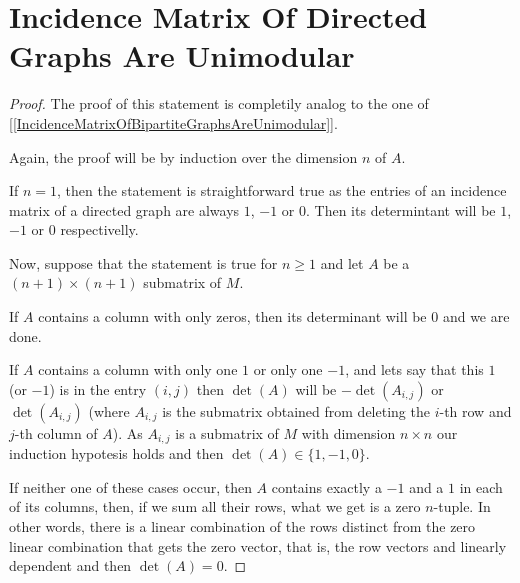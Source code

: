 ﻿\chapter{Incidence Matrix Of Directed Graphs Are Unimodular}


\begin{proof}
    The proof of this statement is completily analog to the one of [\ref{IncidenceMatrixOfBipartiteGraphsAreUnimodular}].\pn
    
    Again, the proof will be by induction over the dimension $n$ of $A$.\pn
    
    If $n=1$, then the statement is straightforward true as the entries of an incidence matrix of a directed graph are always
    $1$, $-1$ or $0$. Then its determintant will be $1$, $-1$ or $0$ respectivelly.\pn
    
    Now, suppose that the statement is true for $n \geq 1$ and let $A$ be a $(n+1) \times (n+1)$ submatrix of $M$.\pn
    
    If $A$ contains a column with only zeros, then its determinant will be $0$ and we are done.\pn
    
    If $A$ contains a column with only one $1$ or only one $-1$, and lets say that this $1$ (or $-1$) is in the entry $(i,j)$
    then $\det(A)$ will be $-\det(A_{i,j})$ or $\det(A_{i,j})$ (where $A_{i,j}$ is the submatrix obtained from deleting the 
    $i$-th row and $j$-th column of $A$). As $A_{i,j}$ is a submatrix of $M$ with dimension $n \times n$ our induction hypotesis holds
    and then $\det(A) \in \{1, -1, 0\}$.\pn
    
    If neither one of these cases occur, then $A$ contains exactly a $-1$ and a $1$ in each of its columns, then, if we
    sum all their rows, what we get is a zero $n$-tuple. In other words, there is a linear combination of the rows distinct from the
    zero linear combination that gets the zero vector, that is, the row vectors and linearly dependent and then $\det(A) = 0$.
\end{proof}
